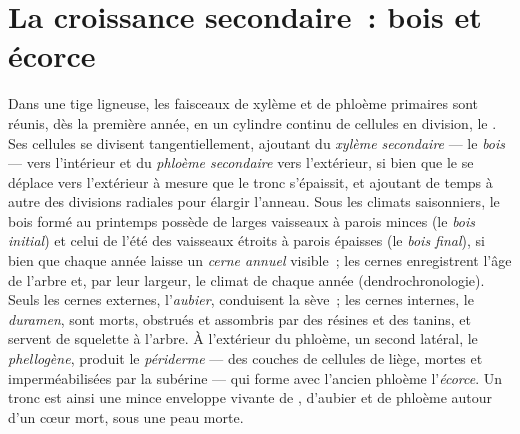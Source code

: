 \section{La croissance secondaire~: bois et écorce}

\begin{definition}\label{def:b2:plant-meristems:wood}
Dans une tige ligneuse, les faisceaux de xylème et de phloème primaires
sont réunis, dès la première année, en un cylindre continu de cellules
en division, le \emph{}. Ses cellules se divisent
tangentiellement, ajoutant du \emph{xylème secondaire} --- le
\emph{bois} --- vers l'intérieur et du \emph{phloème secondaire} vers
l'extérieur, si bien que le  se déplace vers l'extérieur à mesure
que le tronc s'épaissit, et ajoutant de temps à autre des divisions
radiales pour élargir l'anneau. Sous les climats saisonniers, le bois
formé au printemps possède de larges vaisseaux à parois minces (le
\emph{bois initial}) et celui de l'été des vaisseaux étroits à parois
épaisses (le \emph{bois final}), si bien que chaque année laisse un
\emph{cerne annuel} visible~; les cernes enregistrent l'âge de l'arbre
et, par leur largeur, le climat de chaque année (dendrochronologie).
Seuls les cernes externes, l'\emph{aubier}, conduisent la sève~; les
cernes internes, le \emph{duramen}, sont morts, obstrués et assombris
par des résines et des tanins, et servent de squelette à l'arbre. À
l'extérieur du phloème, un second  latéral, le
\emph{phellogène}, produit le \emph{périderme} --- des couches de
cellules de liège, mortes et imperméabilisées par la subérine --- qui
forme avec l'ancien phloème l'\emph{écorce}. Un tronc est ainsi une
mince enveloppe vivante de , d'aubier et de phloème autour d'un
cœur mort, sous une peau morte.
\end{definition}

